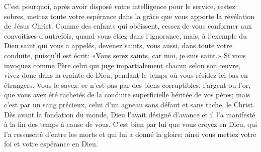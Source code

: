C’est pourquoi, après avoir disposé votre intelligence pour le service,
	restez sobres, mettez toute votre espérance dans la grâce
		que vous apporte la révélation de Jésus Christ.
Comme des enfants qui obéissent,
	cessez de vous conformer aux convoitises d’autrefois,
	quand vous étiez dans l’ignorance,
	mais, à l’exemple du Dieu saint qui vous a appelés,
	devenez saints, vous aussi, dans toute votre conduite,
	puisqu’il est écrit: «Vous serez saints, car moi, je suis saint.»
Si vous invoquez comme Père celui qui juge impartialement chacun selon son œuvre,
	vivez donc dans la crainte de Dieu,
	pendant le temps où vous résidez ici-bas en étrangers.
Vous le savez: ce n’est pas par des biens corruptibles, l’argent ou l’or,
	que vous avez été rachetés de la conduite superficielle héritée de vos pères;
	mais c’est par un sang précieux,
	celui d’un agneau sans défaut et sans tache, le Christ.
Dès avant la fondation du monde, Dieu l’avait désigné d’avance
	et il l’a manifesté à la fin des temps à cause de vous.
C’est bien par lui que vous croyez en Dieu,
	qui l’a ressuscité d’entre les morts et qui lui a donné la gloire;
	ainsi vous mettez votre foi et votre espérance en Dieu.
